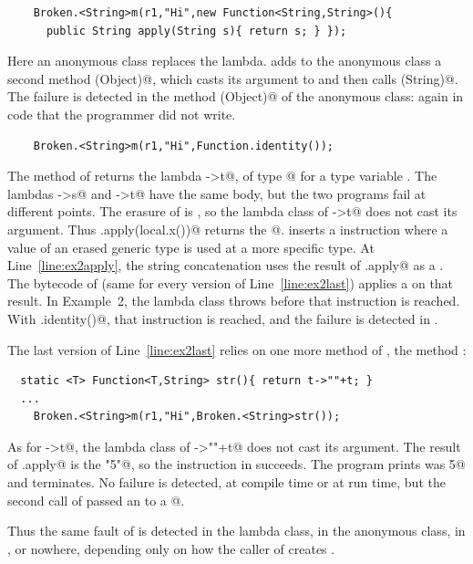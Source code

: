 \begin{lstlisting}
    Broken.<String>m(r1,"Hi",new Function<String,String>(){
      public String apply(String s){ return s; } });
\end{lstlisting}
Here an anonymous class replaces the lambda.
\javac adds to the anonymous class a second method \Q@apply(Object)@, which casts its argument to \Q@String@ and then calls \Q@apply(String)@.
The failure is detected in the method \Q@apply(Object)@ of the anonymous class: again in code that the programmer did not write.

\begin{lstlisting}
    Broken.<String>m(r1,"Hi",Function.identity());
\end{lstlisting}
The method \Q@identity@ of \Q@Function@ returns the lambda \Q@t->t@, of type @ for a type variable \Q@T@.
The lambdas \Q@s->s@ and \Q@t->t@ have the same body, but the two programs fail at different points.
The erasure of \Q@T@ is \Q@Object@, so the lambda class of \Q@t->t@ does not cast its argument.
Thus \Q@f.apply(local.x())@ returns the \Q@Integer@ {}@.
\javac inserts a \Q@checkcast@ instruction where a value of an erased generic type is used at a more specific type.
At Line~\ref{line:ex2apply}, the string concatenation uses the result of \Q@f.apply@ as a \Q@String@.
The bytecode of \Q@m@ (same for every version of Line~\ref{line:ex2last}) applies a \Q@checkcast@ \Q@String@ on that result.
In Example~2, the lambda class throws before that \Q@checkcast@ instruction is reached.
With \Q@Function.identity()@, that \Q@checkcast@ instruction is reached, and the failure is detected in \Q@m@.

The last version of Line~\ref{line:ex2last} relies on one more method of \Q@Broken@, the method \Q@str@:
\begin{lstlisting}
  static <T> Function<T,String> str(){ return t->""+t; }
  ...
    Broken.<String>m(r1,"Hi",Broken.<String>str());
\end{lstlisting}
As for \Q@t->t@, the lambda class of \Q@t->""+t@ does not cast its argument.
The result of \Q@f.apply@ is the \Q@String@ \Q@"5"@, so the \Q@checkcast@ instruction in \Q@m@ succeeds.
The program prints \Q@old was 5@ and terminates.
No failure is detected, at compile time or at run time, but the second call of \Q@m@ passed an \Q@Integer@ to a @.

Thus the same fault of \Q@m@ is detected in the lambda class, in the anonymous class, in \Q@m@, or nowhere, depending only on how the caller of \Q@m@ creates \Q@f@.

